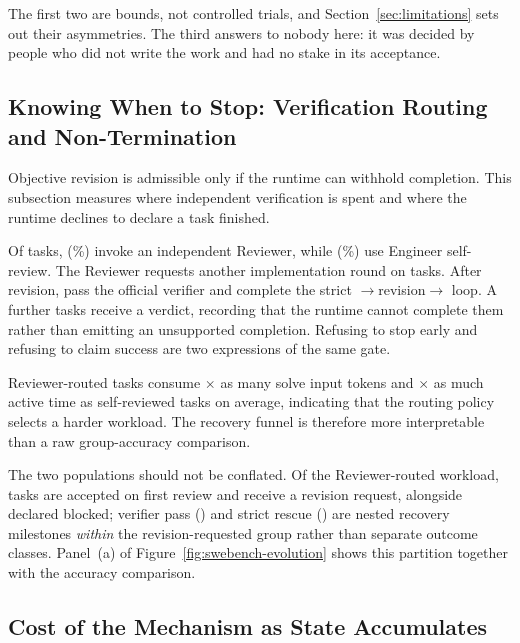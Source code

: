 The first two are bounds, not controlled trials, and Section~\ref{sec:limitations}
sets out their asymmetries. The third answers to nobody here: it was decided by
people who did not write the work and had no stake in its acceptance.

\subsection{Knowing When to Stop: Verification Routing and Non-Termination}

Objective revision is admissible only if the runtime can withhold completion. This
subsection measures where independent verification is spent and where the runtime
declines to declare a task finished.

Of \ReviewerTasks{} tasks, \ReviewerInvoked{} (\ReviewerInvokedPercent\%) invoke
an independent Reviewer, while \ReviewerSkipped{} (\ReviewerSkippedPercent\%) use
Engineer self-review. The Reviewer requests another implementation round on
\ReviewerRevisionRequested{} tasks. After revision, \ReviewerVerifierRecovered{}
pass the official verifier and \ReviewerStrictRescues{} complete the strict
$\rightarrow$revision$\rightarrow$ loop. A further
\ReviewerFirstBlocked{} tasks receive a  verdict, recording that the
runtime cannot complete them rather than emitting an unsupported completion.
Refusing to stop early and refusing to claim success are two expressions of the same
gate.

Reviewer-routed tasks consume \ReviewerTokenRatio$\times$ as many solve input
tokens and \ReviewerTimeRatio$\times$ as much active time as self-reviewed tasks on
average, indicating that the routing policy selects a harder workload. The recovery
funnel is therefore more interpretable than a raw group-accuracy comparison.

The two populations should not be conflated. Of the Reviewer-routed workload,
\ReviewerFirstAccepted{} tasks are accepted on first review and
\ReviewerRevisionRequested{} receive a revision request, alongside
\ReviewerFirstBlocked{} declared blocked; verifier pass
(\ReviewerVerifierRecovered{}) and strict rescue (\ReviewerStrictRescues{}) are
nested recovery milestones \emph{within} the revision-requested group rather than
separate outcome classes. Panel~(a) of Figure~\ref{fig:swebench-evolution} shows
this partition together with the accuracy comparison.

\subsection{Cost of the Mechanism as State Accumulates}

